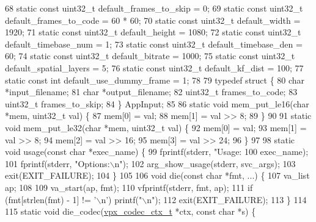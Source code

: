 \begin{DoxyCodeInclude}
68 \textcolor{keyword}{static} \textcolor{keyword}{const} uint32\_t default\_frames\_to\_skip = 0;
69 \textcolor{keyword}{static} \textcolor{keyword}{const} uint32\_t default\_frames\_to\_code = 60 * 60;
70 \textcolor{keyword}{static} \textcolor{keyword}{const} uint32\_t default\_width = 1920;
71 \textcolor{keyword}{static} \textcolor{keyword}{const} uint32\_t default\_height = 1080;
72 \textcolor{keyword}{static} \textcolor{keyword}{const} uint32\_t default\_timebase\_num = 1;
73 \textcolor{keyword}{static} \textcolor{keyword}{const} uint32\_t default\_timebase\_den = 60;
74 \textcolor{keyword}{static} \textcolor{keyword}{const} uint32\_t default\_bitrate = 1000;
75 \textcolor{keyword}{static} \textcolor{keyword}{const} uint32\_t default\_spatial\_layers = 5;
76 \textcolor{keyword}{static} \textcolor{keyword}{const} uint32\_t default\_kf\_dist = 100;
77 \textcolor{keyword}{static} \textcolor{keyword}{const} \textcolor{keywordtype}{int} default\_use\_dummy\_frame = 1;
78 
79 \textcolor{keyword}{typedef} \textcolor{keyword}{struct }\{
80   \textcolor{keywordtype}{char} *input\_filename;
81   \textcolor{keywordtype}{char} *output\_filename;
82   uint32\_t frames\_to\_code;
83   uint32\_t frames\_to\_skip;
84 \} AppInput;
85 
86 \textcolor{keyword}{static} \textcolor{keywordtype}{void} mem\_put\_le16(\textcolor{keywordtype}{char} *mem, uint32\_t val) \{
87   mem[0] = val;
88   mem[1] = val >> 8;
89 \}
90 
91 \textcolor{keyword}{static} \textcolor{keywordtype}{void} mem\_put\_le32(\textcolor{keywordtype}{char} *mem, uint32\_t val) \{
92   mem[0] = val;
93   mem[1] = val >> 8;
94   mem[2] = val >> 16;
95   mem[3] = val >> 24;
96 \}
97 
98 \textcolor{keyword}{static} \textcolor{keywordtype}{void} usage(\textcolor{keyword}{const} \textcolor{keywordtype}{char} *exec\_name) \{
99   fprintf(stderr, \textcolor{stringliteral}{"Usage: %
100           exec\_name);
101   fprintf(stderr, \textcolor{stringliteral}{"Options:\(\backslash\)n"});
102   arg\_show\_usage(stderr, svc\_args);
103   exit(EXIT\_FAILURE);
104 \}
105 
106 \textcolor{keywordtype}{void} die(\textcolor{keyword}{const} \textcolor{keywordtype}{char} *fmt, ...) \{
107   va\_list ap;
108 
109   va\_start(ap, fmt);
110   vfprintf(stderr, fmt, ap);
111   \textcolor{keywordflow}{if} (fmt[strlen(fmt) - 1] != \textcolor{charliteral}{'\(\backslash\)n'}) printf(\textcolor{stringliteral}{"\(\backslash\)n"});
112   exit(EXIT\_FAILURE);
113 \}
114 
115 \textcolor{keyword}{static} \textcolor{keywordtype}{void} die\_codec(\hyperlink{structvpx__codec__ctx}{vpx\_codec\_ctx\_t} *ctx, \textcolor{keyword}{const} \textcolor{keywordtype}{char} *s) \{
}
\end{DoxyCodeInclude}
